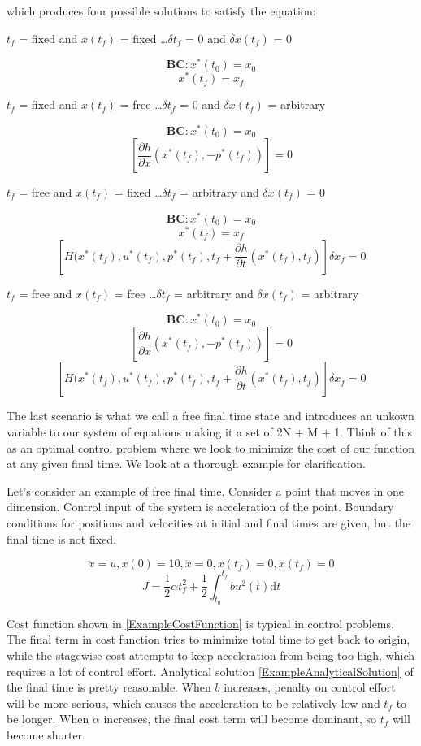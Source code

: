 \documentclass[twoside]{article}
\begin{document}
which produces four possible solutions to satisfy the equation: 

$t_f$ = fixed and $x(t_f)$ = fixed \dots $\delta{t_f}$ = 0 and $\delta{x(t_f)}$ = 0

$$\textbf{BC}: x^*(t_0) = x_0$$
$$x^*(t_f) = x_f$$


$t_f$ = fixed and $x(t_f)$ = free \dots $\delta{t_f}$ = 0 and $\delta{x(t_f)}$ = arbitrary

$$\textbf{BC}: x^*(t_0) = x_0$$
$$[\frac{\partial{h}}{\partial{x}}(x^*(t_f), - p^*(t_f))] = 0$$


$t_f$ = free and $x(t_f)$ = fixed \dots $\delta{t_f}$ = arbitrary and $\delta{x(t_f)}$ = 0

$$\textbf{BC}: x^*(t_0) = x_0$$
$$x^*(t_f) = x_f$$
$$[H(x^*(t_f), u^*(t_f), p^*(t_f), t_f + \frac{\partial{h}}{\partial{t}}(x^*(t_f), t_f)]\delta{x_f} = 0$$



$t_f$ = free and $x(t_f)$ = free \dots $\delta{t_f}$ = arbitrary and $\delta{x(t_f)}$ = arbitrary

$$\textbf{BC}: x^*(t_0) = x_0$$
$$[\frac{\partial{h}}{\partial{x}}(x^*(t_f), - p^*(t_f))] = 0$$
$$[H(x^*(t_f), u^*(t_f), p^*(t_f), t_f + \frac{\partial{h}}{\partial{t}}(x^*(t_f), t_f)]\delta{x_f} = 0$$

The last scenario is what we call a free final time state and introduces an unkown variable to our system of equations making it a set of 2N + M + 1. Think of this as an optimal control problem where we look to minimize the cost of our function at any given final time. We look at a thorough example for clarification. 

Let's consider an example of free final time. Consider a point that moves in one dimension. Control input of the system is acceleration of the point. Boundary conditions for positions and velocities at initial and final times are given, but the final time is not fixed.

\begin{equation}\label{ExampleSCAndBC}%
\ddot{x} = u, x(0) = 10, \dot{x} = 0, x(t_f) = 0, \dot{x}(t_f) = 0
\end{equation}
\begin{equation}\label{ExampleCostFunction}
J = \frac{1}{2}\alpha t_f^2 + \frac{1}{2} \int_{t_0}^{t_f} bu^2(t) \mathrm{d}t
\end{equation}

Cost function shown in \eqref{ExampleCostFunction} is typical in control problems. The final term in cost function tries to minimize total time to get back to origin, while the stagewise cost attempts to keep acceleration from being too high, which requires a lot of control effort. Analytical solution \eqref{ExampleAnalyticalSolution} of the final time is pretty reasonable. When $b$ increases, penalty on control effort will be more serious, which causes the acceleration to be relatively low and $t_f$ to be longer. When $\alpha$ increases, the final cost term will become dominant, so $t_f$ will become shorter.
\end{document}
